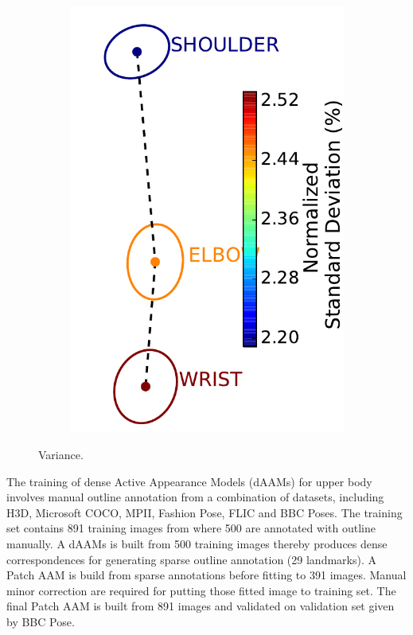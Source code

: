 \begin{figure}[t!]
\begin{subfigure}[b]{0.05\textwidth}
    \end{subfigure}
    \hfill
    \begin{subfigure}[b]{0.08\textwidth}
            \includegraphics[width=\textwidth]{resources/Fig_Variance/variances}
    \end{subfigure}
    \caption{Variance.}
    \label{fig:variance}
\end{figure}

The training of dense Active Appearance Models (dAAMs) for upper body involves manual outline annotation from a combination of datasets, including H3D\cite{PoseletsICCV09}, Microsoft COCO\cite{lin2014microsoft}, MPII\cite{andriluka14cvpr}, Fashion Pose\cite{dantone2013human}, FLIC\cite{sapp2013modec} and BBC Poses\cite{pfister2015flowing}. The training set contains 891 training images from where 500 are annotated with outline manually. A dAAMs is built from 500 training images thereby produces dense correspondences for generating sparse outline annotation (29 landmarks). A Patch AAM is build from sparse annotations before fitting to 391 images. Manual minor correction are required for putting those fitted image to training set. The final Patch AAM is built from 891 images and validated on validation set given by BBC Pose.

